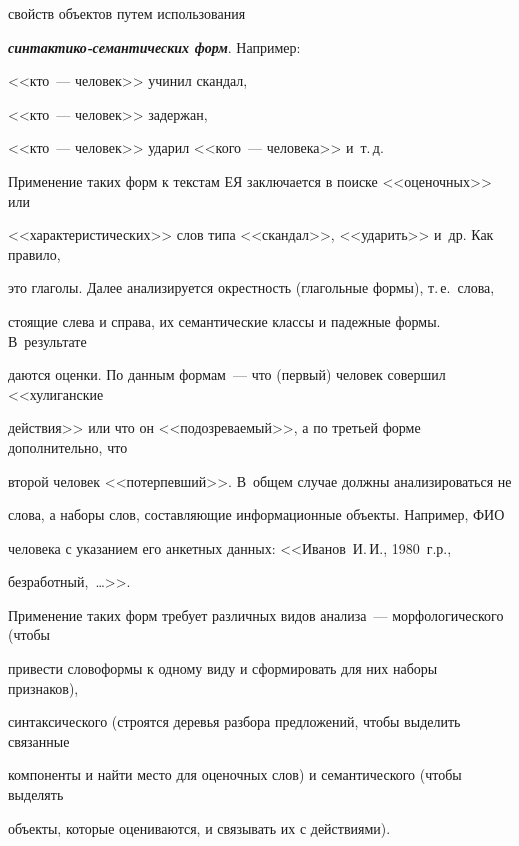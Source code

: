 свойств объектов путем использования  


{\bfseries\textit{синтактико-семантических форм}}. Например:  


         


          <<кто~--- человек>> учинил скандал,





          <<кто~--- человек>> задержан,





          <<кто~--- человек>> ударил <<кого~--- человека>> и~т.\,д.





         Применение таких форм к текстам ЕЯ заключается в поиске <<оценочных>> или 


<<характеристических>> слов типа <<скандал>>, <<ударить>> и~др. Как правило, 


это глаголы. Далее анализируется окрестность (глагольные формы), т.\,е.\ слова, 


стоящие слева и справа, их семантические классы и падежные формы. В~результате 


даются оценки. По данным формам~--- что (первый) человек совершил <<хулиганские 


действия>> или что он <<подозреваемый>>, а по третьей форме дополнительно, что 


второй человек <<потерпевший>>. В~общем случае должны анализироваться не 


слова, а наборы слов, составляющие информационные объекты. Например, ФИО 


человека с указанием его анкетных данных: <<Иванов~И.\,И., 1980~г.р., 


безработный,\ \ldots>>.    





Применение таких форм требует различных видов анализа~--- морфологического (чтобы 


привести словоформы к одному виду и сформировать для них наборы признаков), 


синтаксического (строятся деревья разбора предложений, чтобы выделить связанные 


компоненты и найти место для оценочных слов) и семантического (чтобы выделять 


объекты, которые оцениваются, и связывать их с действиями). 





